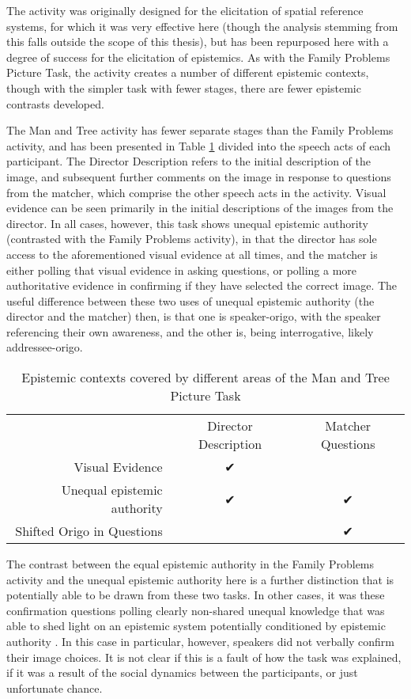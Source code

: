 The activity was originally designed for the elicitation of spatial reference systems, for which it was very effective here (though the analysis stemming from this falls outside the scope of this thesis), but has been repurposed here with a degree of success for the elicitation of epistemics. As with the Family Problems Picture Task, the activity creates a number of different epistemic contexts, though with the simpler task with fewer stages, there are fewer epistemic contrasts developed.

The Man and Tree activity has fewer separate stages than the Family Problems activity, and has been presented in Table \ref{t:Methods:ManTreeEvidentials} divided into the speech acts of each participant. The Director Description refers to the initial description of the image, and subsequent further comments on the image in response to questions from the matcher, which comprise the other speech acts in the activity. Visual evidence can be seen primarily in the initial descriptions of the images from the director. In all cases, however, this task shows unequal epistemic authority (contrasted with the Family Problems activity), in that the director has sole access to the aforementioned visual evidence at all times, and the matcher is either polling that visual evidence in asking questions, or polling a more authoritative evidence in confirming if they have selected the correct image. The useful difference between these two uses of unequal epistemic authority (the director and the matcher) then, is that one is speaker-origo, with the speaker referencing their own awareness, and the other is, being interrogative, likely addressee-origo.

\begin{table}
       \begin{tabular}{r|c|c}
                                          & Director Description & Matcher Questions \\
              Visual Evidence             & ✔                    &                   \\
              Unequal epistemic authority & ✔                    & ✔                 \\
              Shifted Origo in Questions  &                      & ✔
       \end{tabular}
       \caption{Epistemic contexts covered by different areas of the Man and Tree Picture Task}\label{t:Methods:ManTreeEvidentials}
\end{table}

The contrast between the equal epistemic authority in the Family Problems activity and the unequal epistemic authority here is a further distinction that is potentially able to be drawn from these two tasks. In other cases, it was these confirmation questions polling clearly non-shared unequal knowledge that was able to shed light on an epistemic system potentially conditioned by epistemic authority \cite{Bodnaruk2023}. In this case in particular, however, speakers did not verbally confirm their image choices. It is not clear if this is a fault of how the task was explained, if it was a result of the social dynamics between the participants, or just unfortunate chance.


